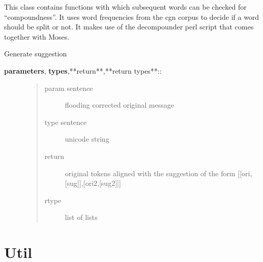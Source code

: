 \documentclass[letterpaper,10pt,english]{sphinxmanual}
\begin{document}
\begin{fulllineitems}
\label{API:norm.modules.wordsplit.Word_Split}
This class contains functions with which subsequent words can be checked for ``compoundness''.
It uses word frequencies from the cgn corpus to decide if a word should be split or not.
It makes use of the decompounder perl script that comes together with Moses.

\begin{fulllineitems}
\label{API:norm.modules.wordsplit.Word_Split.generate_alternatives}
Generate suggestion
\begin{description}
\item[{\textbf{parameters}, \textbf{types},**return**,**return types**::}] \leavevmode\begin{quote}\begin{description}
\item[{param sentence}] \leavevmode
flooding corrected original message

\item[{type sentence}] \leavevmode
unicode string

\item[{return}] \leavevmode
original tokens aligned with the suggestion of the form {[}{[}ori,{[}sug{]}{]},{[}ori2,{[}sug2{]}{]}{]}

\item[{rtype}] \leavevmode
list of lists

\end{description}\end{quote}

\end{description}

\end{fulllineitems}


\end{fulllineitems}



\section{Util}
\label{API:util}\label{API:module-norm.util}
\end{document}
